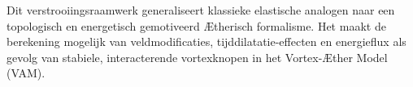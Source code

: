 Dit verstrooiingsraamwerk generaliseert klassieke elastische analogen naar een topologisch en energetisch gemotiveerd Ætherisch formalisme. Het maakt de berekening mogelijk van veldmodificaties, tijddilatatie-effecten en energieflux als gevolg van stabiele, interacterende vortexknopen in het Vortex-Æther Model (VAM).